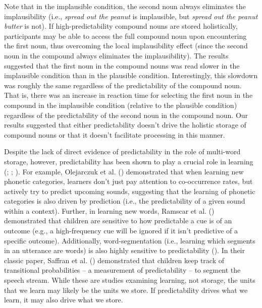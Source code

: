 \documentclass[
  12pt,
  letterpaper,
]{scrreport}
\begin{document}
\noindent Note that in the implausible condition, the second noun always
eliminates the implausibility (i.e., \emph{spread out the peanut} is
implausible, but \emph{spread out the peanut butter} is not). If
high-predictability compound nouns are stored holistically, participants
may be able to access the full compound noun upon encountering the first
noun, thus overcoming the local implausibility effect (since the second
noun in the compound always eliminates the implausibility). The results
suggested that the first noun in the compound nouns was read slower in
the implausible condition than in the plausible condition.
Interestingly, this slowdown was roughly the same regardless of the
predictability of the compound noun. That is, there was an increase in
reaction time for selecting the first noun in the compound in the
implausible condition (relative to the plausible condition) regardless
of the predictability of the second noun in the compound noun. Our
results suggested that either predictability doesn't drive the holistic
storage of compound nouns or that it doesn't facilitate processing in
this manner.

Despite the lack of direct evidence of predictability in the role of
multi-word storage, however, predictability has been shown to play a
crucial role in learning
(;
; ). For example, Olejarczuk et al.
()
demonstrated that when learning new phonetic categories, learners don't
just pay attention to co-occurrence rates, but actively try to predict
upcoming sounds, suggesting that the learning of phonetic categories is
also driven by prediction (i.e., the predictability of a given sound
within a context). Further, in learning new words, Ramscar et al.
()
demonstrated that children are sensitive to how predictable a cue is of
an outcome (e.g., a high-frequency cue will be ignored if it isn't
predictive of a specific outcome). Additionally, word-segmentation
(i.e., learning which segments in an utterance are words) is also highly
sensitive to predictability
(). In their classic paper, Saffran et al.
()
demonstrated that children keep track of transitional probabilities -- a
measurement of predictability -- to segment the speech stream. While
these are studies examining learning, not storage, the units that we
learn may likely be the units we store. If predictability drives what we
learn, it may also drive what we store.
\end{document}
